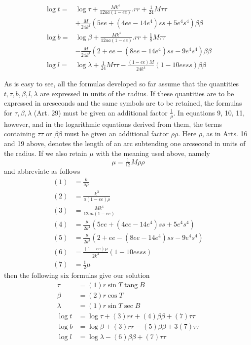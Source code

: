 %
\[
\begin{aligned}
\log t={}&\log\tau+\frac{Mk^4}{12aa(1-ee)}\mathord{.}rr+\tfrac1{24}M\tau\tau\\
&+\frac M{24k^4}(5ee+(4ee-14e^4)ss+5e^4s^4)\beta\beta\\
\log b={}&\log\beta+\frac{Mk^4}{12aa(1-ee)}\mathord{.}rr+\tfrac18M\tau\tau\\
&-\frac M{24k^4}(2+ee-(8ee-14e^4)ss-9e^4s^4)\beta\beta\\
\log l={}&\log\lambda+\tfrac1{24}M\tau\tau-\frac{(1-ee)M}{24k^4}(1-10eess)\beta\beta
\end{aligned}
\]

As is easy to see, all the formulas developed so far assume that the quantities \(t,\tau,b,\beta,l,\lambda\) are expressed in units of the radius. If these quantities are to be expressed in arcseconds and the same symbols are to be retained, the formulas for \(\tau,\beta,\lambda\) (Art. 29) must be given an additional factor \(\frac1\rho\). In equations 9, 10, 11, however, and in the logarithmic equations derived from them, the terms containing \(\tau\tau\) or \(\beta\beta\) must be given an additional factor \(\rho\rho\). Here \(\rho\), as in Arts. 16 and 19 above, denotes the length of an arc subtending one arcsecond in units of the radius. If we also retain \(\mu\) with the meaning used above, namely
\[
\mu=\tfrac1{12}M\rho\rho
\]
and abbreviate as follows
\[
\begin{aligned}
(1)&=\frac{k}{a\rho}\\
(2)&=\frac{k^3}{a(1-ee)\rho}\\
(3)&=\frac{Mk^4}{12aa(1-ee)}\\
(4)&=\frac{\mu}{2k^4}(5ee+(4ee-14e^4)ss+5e^4s^4)\\
(5)&=\frac{\mu}{2k^4}(2+ee-(8ee-14e^4)ss-9e^4s^4)\\
(6)&=\frac{(1-ee)\mu}{2k^4}(1-10eess)\\
(7)&=\tfrac12\mu
\end{aligned}
\]
then the following six formulas give our solution
\[
\begin{aligned}
\tau&=(1)r\sin T\operatorname{tang}B\\
\beta&=(2)r\cos T\\
\lambda&=(1)r\sin T\sec B\\
\log t&=\log\tau+(3)rr+(4)\beta\beta+(7)\tau\tau\\
\log b&=\log\beta+(3)rr-(5)\beta\beta+3(7)\tau\tau\\
\log l&=\log\lambda-(6)\beta\beta+(7)\tau\tau
\end{aligned}
\]

